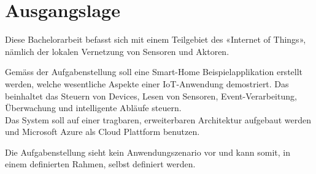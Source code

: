 \section{Ausgangslage}
Diese Bachelorarbeit befasst sich mit einem Teilgebiet des «Internet of Things», nämlich der lokalen Vernetzung von Sensoren und Aktoren.

Gemäss der Aufgabenstellung soll eine Smart-Home Beispielapplikation erstellt werden, welche wesentliche Aspekte  einer IoT-Anwendung demostriert. Das beinhaltet das Steuern von Devices, Lesen von Sensoren, Event-Verarbeitung, Überwachung und intelligente Abläufe steuern. \\
Das System soll auf einer tragbaren, erweiterbaren Architektur aufgebaut werden und Microsoft Azure als Cloud Plattform benutzen.

Die Aufgabenstellung sieht kein Anwendungszenario vor und kann somit, in einem definierten Rahmen, selbst definiert werden.


